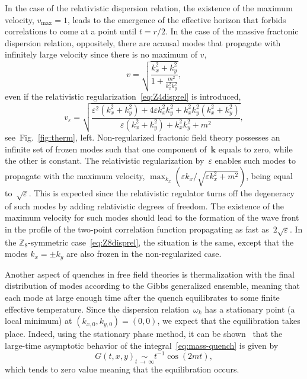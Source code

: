 \documentclass[a4paper,12pt]{article}
\newcommand{\be}{\begin{equation}}
\newcommand{\ee}{\end{equation}}
\newcommand{\skipline}{\vspace{\baselineskip}}
\newcommand{\eps}{\varepsilon}
\newcommand{\om}{\omega}
\newcommand{\largetimesim}{\underset{t\,\to\,\infty}{\sim}}
\newcommand{\Z}[1]{\mathbb{Z}_{#1}}
\newcommand{\figref}[1]{Fig.~\ref{#1}}
\begin{document}
\skipline

In the case of the relativistic dispersion relation, the existence of the maximum velocity, $v_\text{max} = 1$, leads to the emergence of the effective horizon that forbids correlations to come at a point until $t = r/2$. In the case of the massive fractonic dispersion relation, oppositely, there are acausal modes that propagate with infinitely large velocity since there is no maximum of $v$,
\be
    v = \sqrt{\frac{k_x^2 + k_y^2}{1 + \displaystyle\frac{m^2}{k_x^2 k_y^2}}},
\ee
even if the relativistic regularization~\eqref{eq:Z4disprel} is introduced,
\be
    v_{\eps} = \sqrt{\frac{\eps^2\left(k_x^2 + k_y^2\right) + 4\eps k_x^2k_y^2 + k_x^2k_y^2\left(k_x^2 + k_y^2\right)}{\eps\left(k_x^2 + k_y^2\right) + k_x^2k_y^2 + m^2}},
    \label{eq:vel}
\ee
see~\figref{fig:therm}, left. Non-regularized fractonic field theory possesses an infinite set of frozen modes such that one component of~$\mathbf{k}$ equals to zero, while the other is constant. The relativistic regularization by~$\eps$ enables such modes to propagate with the maximum velocity, $\max_{k_x}(\eps k_x/\sqrt{\eps k_x^2 + m^2})$, being equal to~$\sqrt{\eps}$. This is expected since the relativistic regulator turns off the degeneracy of such modes by adding relativistic degrees of freedom. The existence of the maximum velocity for such modes should lead to the formation of the wave front in the profile of the two-point correlation function propagating as fast as~$2\sqrt{\eps}$. In the $\Z8$-symmetric case~\eqref{eq:Z8disprel}, the situation is the same, except that the modes $k_x = \pm k_y$ are also frozen in the non-regularized case.

\skipline

Another aspect of quenches in free field theories is thermalization with the final distribution of modes according to the Gibbs generalized ensemble, meaning that each mode at large enough time after the quench equilibrates to some finite effective temperature. Since the dispersion relation~$\om_k$ has a stationary point (a local minimum) at $(k_{x,0}, k_{y,0}) = (0, 0)$, we expect that the equilibration takes place. Indeed, using the stationary phase method, it can be shown~\cite{Calabrese:2007rg} that the large-time asymptotic behavior of the integral~\eqref{eq:mass-quench} is given by
\be
    G(t, x, y) \largetimesim t^{-1}\cos\left(2mt\right),
\ee
which tends to zero value meaning that the equilibration occurs.
\end{document}

